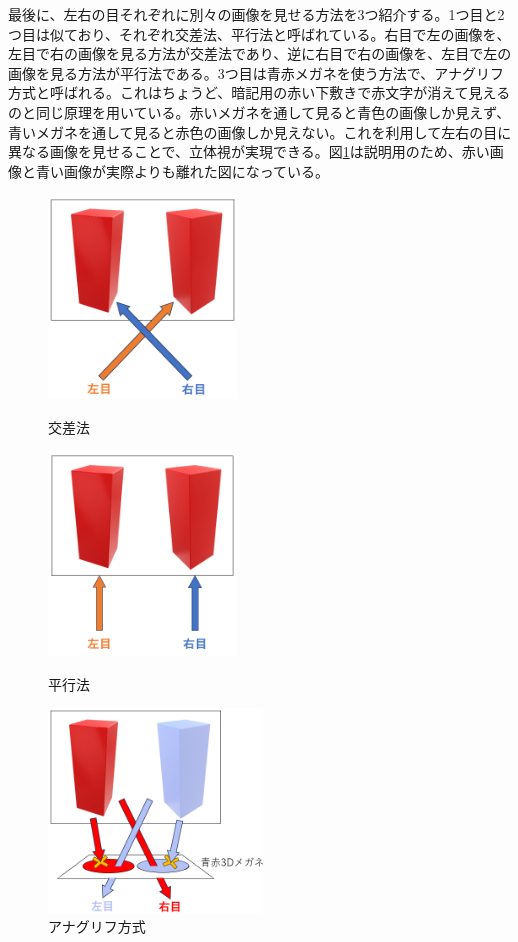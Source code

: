 \documentclass[../main]{subfiles}
\begin{document}
最後に、左右の目それぞれに別々の画像を見せる方法を3つ紹介する。1つ目と2つ目は似ており、それぞれ交差法、平行法と呼ばれている。右目で左の画像を、左目で右の画像を見る方法が交差法であり、逆に右目で右の画像を、左目で左の画像を見る方法が平行法である。3つ目は青赤メガネを使う方法で、アナグリフ方式と呼ばれる。これはちょうど、暗記用の赤い下敷きで赤文字が消えて見えるのと同じ原理を用いている。赤いメガネを通して見ると青色の画像しか見えず、青いメガネを通して見ると赤色の画像しか見えない。これを利用して左右の目に異なる画像を見せることで、立体視が実現できる。図\ref{fig:stereo_glass}は説明用のため、赤い画像と青い画像が実際よりも離れた図になっている。
\begin{figure}[H]
  \centering
  \begin{minipage}[b]{0.32\linewidth}
    \centering
    \includegraphics[width=5cm]{sections/Fujisawa/image/stereo_cross.PNG}
    \caption{交差法}
    \label{fig:stereo_cross}
  \end{minipage}
  \begin{minipage}[b]{0.32\linewidth}
    \centering
    \includegraphics[width=5cm]{sections/Fujisawa/image/stereo_parallel.PNG}
    \caption{平行法}
    \label{fig:stereo_parallel}
  \end{minipage}
  \begin{minipage}[b]{0.32\linewidth}
    \centering
    \includegraphics[width=5.7cm]{sections/Fujisawa/image/stereo_glass.PNG}
    \caption{アナグリフ方式}
    \label{fig:stereo_glass}
  \end{minipage}
\end{figure}
\end{document}
